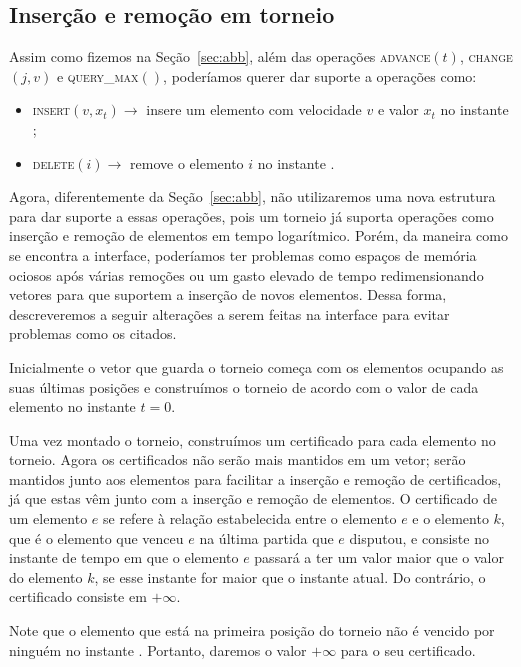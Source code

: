 
\FloatBarrier

\subsection{Inserção e remoção em torneio} \label{subsec:torneio-insere-remove}

Assim como fizemos na Seção~\ref{sec:abb}, além das operações
\textsc{advance}$(t)$, \textsc{change}$(j, v)$ e
\textsc{query\_max}$()$, poderíamos querer dar suporte a operações
como:

\begin{itemize}
    \item \textsc{insert}$(v, x_t)\rightarrow$ insere um elemento
    com velocidade $v$ e valor $x_t$ no instante \now;
    \item \textsc{delete}$(i) \rightarrow$ remove o elemento $i$ no
    instante \now.
\end{itemize}
Agora, diferentemente da Seção~\ref{sec:abb}, não utilizaremos uma nova estrutura para dar suporte
a essas operações, pois um torneio já suporta operações como inserção e remoção de elementos em
tempo logarítmico.
Porém, da maneira como se encontra a interface, poderíamos ter problemas como espaços de memória
ociosos após várias remoções ou um gasto elevado de tempo redimensionando vetores para que
suportem a inserção de novos elementos.
Dessa forma, descreveremos a seguir alterações a serem feitas na interface para evitar problemas
como os citados.

Inicialmente o vetor que guarda o torneio começa com os elementos ocupando as suas últimas
posições e construímos o torneio de acordo com o valor de cada elemento no instante $t = 0$.

Uma vez montado o torneio, construímos um certificado para cada elemento no torneio.
Agora os certificados não serão mais mantidos em um vetor;
serão mantidos junto aos elementos para facilitar a inserção e remoção de certificados, já que
estas vêm junto com a inserção e remoção de elementos.
O certificado de um elemento $e$ se refere à relação estabelecida entre o elemento $e$ e o
elemento $k$, que é o elemento que venceu $e$ na última partida que $e$ disputou, e consiste no
instante de tempo em que o elemento $e$ passará a ter um valor maior que o valor do elemento $k$,
se esse instante for maior que o instante atual.
Do contrário, o certificado consiste em $+\infty$.

Note que o elemento que está na primeira posição do torneio não é vencido por ninguém no instante
\now.
Portanto, daremos o valor $+\infty$ para o seu certificado.

